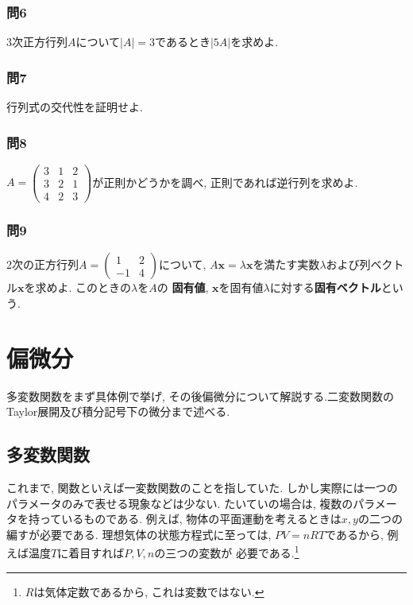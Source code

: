     \subsubsection*{問6}3次正方行列$A$について$|A|=3$であるとき$|5A|$を求めよ.

    \subsubsection*{問7}行列式の交代性を証明せよ.

    \subsubsection*{問8}$A=\begin{pmatrix}
        3 & 1 & 2\\
        3 & 2 & 1\\
        4 & 2 & 3
    \end{pmatrix}$が正則かどうかを調べ, 正則であれば逆行列を求めよ.
    \vspace{-0.5cm}

    \subsubsection*{問9} 2次の正方行列$A=\begin{pmatrix}1 & 2\\-1 & 4\end{pmatrix}$について, $A\bm{x}=\lambda\bm{x}$を満たす実数$\lambda$および列ベクトル$\bm{x}$を求めよ. このときの$\lambda$を$A$の
    \textbf{固有値}, $\bm{x}$を固有値$\lambda$に対する\textbf{固有ベクトル}という. 
\clearpage
\section{偏微分}
    多変数関数をまず具体例で挙げ, その後偏微分について解説する.二変数関数のTaylor展開及び積分記号下の微分まで述べる.
    \subsection{多変数関数}
        これまで, 関数といえば一変数関数のことを指していた. しかし実際には一つのパラメータのみで表せる現象などは少ない. たいていの場合は, 複数のパラメータを持っているものである.
        例えば, 物体の平面運動を考えるときは$x,y$の二つの編すが必要である. 理想気体の状態方程式に至っては, $PV=nRT$であるから, 例えば温度$T$に着目すれば$P,V,n$の三つの変数が
        必要である.\footnote{$R$は気体定数であるから, これは変数ではない.}

